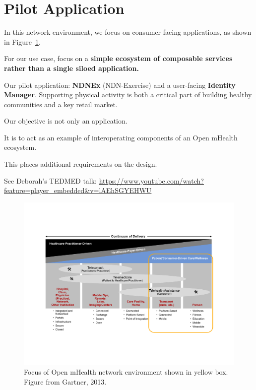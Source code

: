 \section{Pilot Application}

In this network environment, we focus on consumer-facing applications, as shown in Figure~\ref{fig:continuum}. 

For our use case, focus on a \textbf{simple ecosystem of composable services rather than a single siloed application.}

Our pilot application:  \textbf{NDNEx} (NDN-Exercise) and a user-facing \textbf{Identity Manager}.  Supporting physical activity is both a critical part of building healthy communities and a key retail market. 

Our objective is not only an application.

It is to act as an example of interoperating components of an Open mHealth ecosystem.

This places additional requirements on the design.

See Deborah's TEDMED talk: 
\url{https://www.youtube.com/watch?feature=player_embedded&v=lAEhSGYEHWU}


\begin{figure}
\begin{center}
\includegraphics[width=.8\textwidth]{figures/continuum}
\caption{{Focus of Open mHealth network environment shown in yellow box. Figure from Gartner, 2013.  }}
\label{fig:continuum}
\end{center}
\end{figure}



